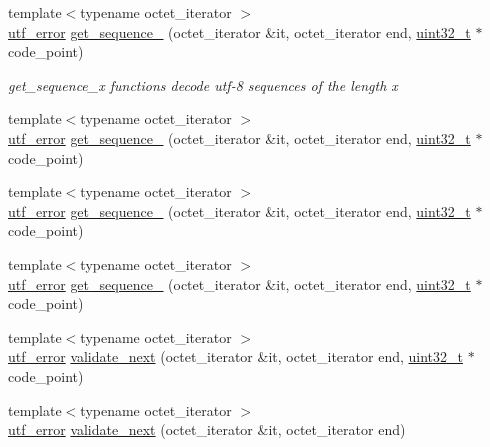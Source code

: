 \begin{DoxyCompactItemize}
\item 
{\footnotesize template$<$typename octet\+\_\+iterator $>$ }\\\hyperlink{namespaceutf8_1_1internal_a9e96c2bc98b37e336b787a281090392c}{utf\+\_\+error} \hyperlink{namespaceutf8_1_1internal_aee50a9a2e67e6652f1327814453182a0}{get\+\_\+sequence\+\_} (octet\+\_\+iterator \&it, octet\+\_\+iterator end, \hyperlink{namespaceutf8_a846259d2f173d524282583fc9d825b00}{uint32\+\_\+t} $\ast$code\+\_\+point)
\begin{DoxyCompactList}\small\item\em get\+\_\+sequence\+\_\+x functions decode utf-\/8 sequences of the length x \end{DoxyCompactList}\item 
{\footnotesize template$<$typename octet\+\_\+iterator $>$ }\\\hyperlink{namespaceutf8_1_1internal_a9e96c2bc98b37e336b787a281090392c}{utf\+\_\+error} \hyperlink{namespaceutf8_1_1internal_a58480c0bb500400a6615e11e4b27a961}{get\+\_\+sequence\+\_} (octet\+\_\+iterator \&it, octet\+\_\+iterator end, \hyperlink{namespaceutf8_a846259d2f173d524282583fc9d825b00}{uint32\+\_\+t} $\ast$code\+\_\+point)
\item 
{\footnotesize template$<$typename octet\+\_\+iterator $>$ }\\\hyperlink{namespaceutf8_1_1internal_a9e96c2bc98b37e336b787a281090392c}{utf\+\_\+error} \hyperlink{namespaceutf8_1_1internal_a95b2c140e79250df0f0dda1273ff4b44}{get\+\_\+sequence\+\_} (octet\+\_\+iterator \&it, octet\+\_\+iterator end, \hyperlink{namespaceutf8_a846259d2f173d524282583fc9d825b00}{uint32\+\_\+t} $\ast$code\+\_\+point)
\item 
{\footnotesize template$<$typename octet\+\_\+iterator $>$ }\\\hyperlink{namespaceutf8_1_1internal_a9e96c2bc98b37e336b787a281090392c}{utf\+\_\+error} \hyperlink{namespaceutf8_1_1internal_a2666070586ed807dbe10fd5ff47964b4}{get\+\_\+sequence\+\_} (octet\+\_\+iterator \&it, octet\+\_\+iterator end, \hyperlink{namespaceutf8_a846259d2f173d524282583fc9d825b00}{uint32\+\_\+t} $\ast$code\+\_\+point)
\item 
{\footnotesize template$<$typename octet\+\_\+iterator $>$ }\\\hyperlink{namespaceutf8_1_1internal_a9e96c2bc98b37e336b787a281090392c}{utf\+\_\+error} \hyperlink{namespaceutf8_1_1internal_ad47161d7978314d9e4177b6fd4173128}{validate\+\_\+next} (octet\+\_\+iterator \&it, octet\+\_\+iterator end, \hyperlink{namespaceutf8_a846259d2f173d524282583fc9d825b00}{uint32\+\_\+t} $\ast$code\+\_\+point)
\item 
{\footnotesize template$<$typename octet\+\_\+iterator $>$ }\\\hyperlink{namespaceutf8_1_1internal_a9e96c2bc98b37e336b787a281090392c}{utf\+\_\+error} \hyperlink{namespaceutf8_1_1internal_afd41668f94ce9f60f8e314d05804cecc}{validate\+\_\+next} (octet\+\_\+iterator \&it, octet\+\_\+iterator end)
\end{DoxyCompactItemize}
